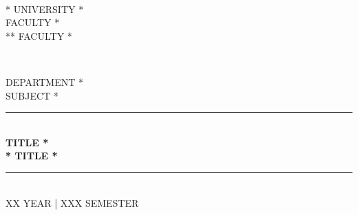 \documentclass[12pt,a4paper, english]{article}
\begin{document}
\begin{titlepage}
  \newcommand{\HRule}{\rule{\linewidth}{0.5mm}}
  \centering

   \textsc{}\\[0.25cm]

   \textsc{\huge{* UNIVERSITY *}}\\[0.5cm]

   \textsc{\LARGE * FACULTY *\\ ** FACULTY *}\\[0.3cm]

   \begin{figure}[H]
     \centering
     \qquad
     \\[0.5cm]
   \end{figure}

   \textsc{\Large * DEPARTMENT *}\\[0.25cm]

   \textsc{\large * SUBJECT *}\\[0.25cm]

   \HRule\\[0.4cm]

   {\huge\bfseries * TITLE *\\[0.4cm] * TITLE *}\\[0.4cm]
   \HRule\\[1.25cm]

    \textsc{\large XX YEAR | XXX SEMESTER}\\[1.5cm]


\end{titlepage}
\end{document}

